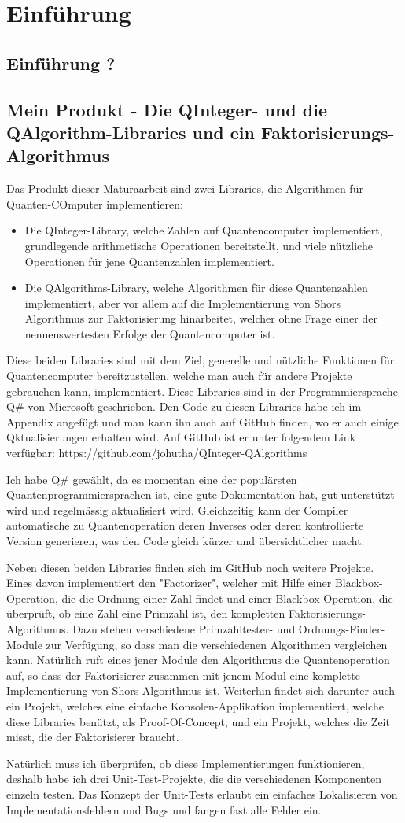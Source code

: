 \chapter{Einführung}
\section{Einführung ?}
\section{Mein Produkt - Die QInteger- und die QAlgorithm-Libraries und ein Faktorisierungs-Algorithmus}
Das Produkt dieser Maturaarbeit sind zwei Libraries, die Algorithmen für Quanten-COmputer implementieren: 
\begin{itemize}
    \item Die QInteger-Library, welche Zahlen auf Quantencomputer implementiert, grundlegende arithmetische Operationen bereitstellt, und viele nützliche Operationen für jene Quantenzahlen implementiert.
    \item Die QAlgorithms-Library, welche Algorithmen für diese Quantenzahlen implementiert, aber vor allem auf die Implementierung von Shors Algorithmus zur Faktorisierung hinarbeitet, welcher ohne Frage einer der nennenswertesten Erfolge der Quantencomputer ist.
\end{itemize}
Diese beiden Libraries sind mit dem Ziel, generelle und nützliche Funktionen für Quantencomputer bereitzustellen, welche man auch für andere Projekte gebrauchen kann, implementiert. Diese Libraries sind in der Programmiersprache Q\# von Microsoft geschrieben. Den Code zu diesen Libraries habe ich im Appendix angefügt und man kann ihn auch auf GitHub finden, wo er auch einige Qktualisierungen erhalten wird. Auf GitHub ist er unter folgendem Link verfügbar: https://github.com/johutha/QInteger-QAlgorithms

Ich habe Q\# gewählt, da es momentan eine der populärsten Quantenprogrammiersprachen ist, eine gute Dokumentation hat, gut unterstützt wird und regelmässig aktualisiert wird. Gleichzeitig kann der Compiler automatische zu Quantenoperation deren Inverses oder deren kontrollierte Version generieren, was den Code gleich kürzer und übersichtlicher macht. 

Neben diesen beiden Libraries finden sich im GitHub noch weitere Projekte. Eines davon implementiert den "Factorizer", welcher mit Hilfe einer Blackbox-Operation, die die Ordnung einer Zahl findet und einer Blackbox-Operation, die überprüft, ob eine Zahl eine Primzahl ist, den kompletten Faktorisierungs-Algorithmus. Dazu stehen verschiedene Primzahltester- und Ordnungs-Finder-Module zur Verfügung, so dass man die verschiedenen Algorithmen vergleichen kann. Natürlich ruft eines jener Module den Algorithmus die Quantenoperation auf, so dass der Faktorisierer zusammen mit jenem Modul eine komplette Implementierung von Shors Algorithmus ist. Weiterhin findet sich darunter auch ein Projekt, welches eine einfache Konsolen-Applikation implementiert, welche diese Libraries benützt, als Proof-Of-Concept, und ein Projekt, welches die Zeit misst, die der Faktorisierer braucht.

Natürlich muss ich überprüfen, ob diese Implementierungen funktionieren, deshalb habe ich drei Unit-Test-Projekte, die die verschiedenen Komponenten einzeln testen. Das Konzept der Unit-Tests erlaubt ein einfaches Lokalisieren von Implementationsfehlern und Bugs und fangen fast alle Fehler ein.